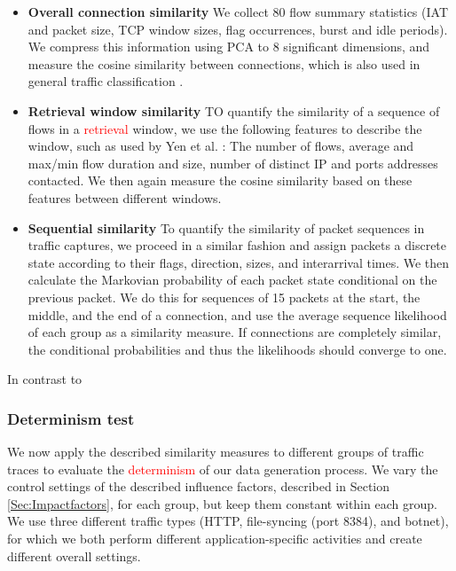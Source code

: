 \documentclass{article}
\begin{document}
\begin{itemize}
\item \textbf{Overall connection similarity} We collect 80 flow summary statistics (IAT and packet size, TCP window sizes, flag occurrences, burst and idle periods). We compress this information using PCA to 8 significant dimensions, and measure the cosine similarity between connections, which is also used in general traffic classification \cite{aun2017review}.
\item \textbf{Retrieval window similarity} 
TO quantify the similarity of a sequence of flows in a \textcolor{red}{retrieval} window, we use the following features to describe the window, such as used by Yen et al. \cite{yen2009browser}: The number of flows, average and max/min flow duration and size, number of distinct IP and ports addresses contacted. We then again measure the cosine similarity based on these features between different windows. 

\item \textbf{Sequential similarity} To quantify the similarity of packet sequences in traffic captures, we proceed in a similar fashion and assign packets a discrete state according to their flags, direction, sizes, and interarrival times. We then calculate the Markovian probability of each packet state conditional on the previous packet. We do this for sequences of 15 packets at the start, the middle, and the end of a connection, and use the average sequence likelihood of each group as a similarity measure. If connections are completely similar, the conditional probabilities and thus the likelihoods should converge to one.
\end{itemize}

In contrast to 


\subsubsection{Determinism test}


We now apply the described similarity measures to different groups of traffic traces to evaluate the \textcolor{red}{determinism} of our data generation process. We vary the control settings of the described influence factors, described in Section \ref{Sec:Impactfactors}, for each group, but keep them constant within each group. We use three different traffic types (HTTP, file-syncing (port 8384), and botnet), for which we both perform different application-specific activities and create different overall settings. 
\end{document}
